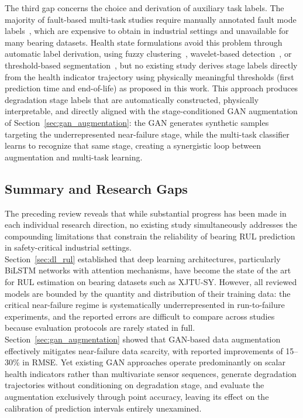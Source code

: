 The third gap concerns the choice and derivation of auxiliary task
labels. The majority of fault-based multi-task studies require
manually annotated fault mode
labels~\cite{8709822, LAI2026112091, 11434241}, which are expensive
to obtain in industrial settings and unavailable for many bearing
datasets. Health state formulations avoid this problem through
automatic label derivation, using fuzzy
clustering~\cite{10295667}, wavelet-based detection~\cite{11363290},
or threshold-based
segmentation~\cite{zhang_health_2022, 11451867}, but no existing
study derives stage labels directly from the health indicator
trajectory using physically meaningful thresholds (first prediction
time and end-of-life) as proposed in this work. This approach
produces degradation stage labels that are automatically constructed,
physically interpretable, and directly aligned with the
stage-conditioned GAN augmentation of
Section~\ref{sec:gan_augmentation}: the GAN generates synthetic
samples targeting the underrepresented near-failure stage, while the
multi-task classifier learns to recognize that same stage, creating a
synergistic loop between augmentation and multi-task learning.


\subsection{Summary and Research Gaps}
\label{sec:summary_gaps}

The preceding review reveals that while substantial progress has been
made in each individual research direction, no existing study
simultaneously addresses the compounding limitations that
constrain the reliability of bearing RUL prediction in
safety-critical industrial settings.\\

Section~\ref{sec:dl_rul} established that deep learning architectures,
particularly BiLSTM networks with attention mechanisms, have
become the state of the art for RUL estimation on bearing datasets
such as XJTU-SY. However, all reviewed models are bounded by the
quantity and distribution of their training data: the critical
near-failure regime is systematically underrepresented in
run-to-failure experiments, and the reported errors are difficult to
compare across studies because evaluation protocols are rarely stated
in full.\\

Section~\ref{sec:gan_augmentation} showed that GAN-based data
augmentation effectively mitigates near-failure data scarcity, with
reported improvements of 15--30\% in RMSE. Yet existing GAN
approaches operate predominantly on scalar health indicators rather
than multivariate sensor sequences, generate degradation trajectories
without conditioning on degradation stage, and evaluate the
augmentation exclusively through point accuracy, leaving its effect on
the calibration of prediction intervals entirely unexamined.\\

